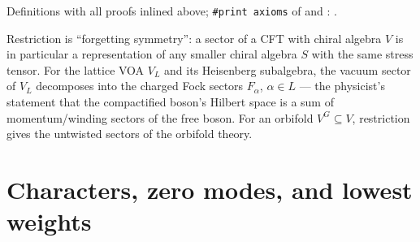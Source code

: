 \begin{status}
Definitions with all proofs inlined above; \texttt{\#print axioms} of
 and : .
\end{status}

\begin{physics}
Restriction is ``forgetting symmetry'': a sector of a CFT with chiral algebra $V$ is in particular a
representation of any smaller chiral algebra $S$ with the same stress tensor. For the lattice VOA $V_L$ and its
Heisenberg subalgebra, the vacuum sector of $V_L$ decomposes into the charged Fock sectors $F_\alpha$, $\alpha\in L$
--- the physicist's statement that the compactified boson's Hilbert space is a sum of momentum/winding sectors of
the free boson. For an orbifold $V^G\subseteq V$, restriction gives the untwisted sectors of the orbifold theory.
\end{physics}

\section{Characters, zero modes, and lowest weights}\label{l12:sec:char}

